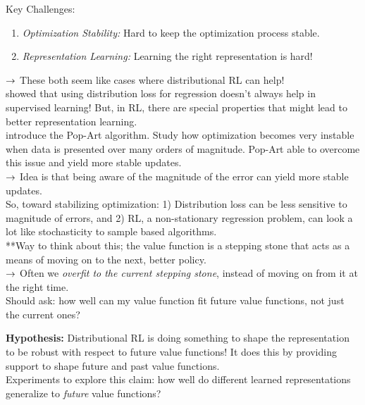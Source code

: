 Key Challenges:
\begin{enumerate}
    \item {\it Optimization Stability:} Hard to keep the optimization process stable.
    \item {\it Representation Learning:} Learning the right representation is hard!
\end{enumerate}

$\rightarrow$ These both seem like cases where distributional RL can help! \\


\citet{imani2018improving} showed that using distribution loss for regression doesn't always help in supervised learning! But, in RL, there are special properties that might lead to better representation learning. \\

\citet{van2016learning} introduce the Pop-Art algorithm. Study how optimization becomes very instable when data is presented over many orders of magnitude. Pop-Art able to overcome this issue and yield more stable updates.\\

$\rightarrow$ Idea is that being aware of the magnitude of the error can yield more stable updates. \\

So, toward stabilizing optimization: 1) Distribution loss can be less sensitive to magnitude of errors, and 2) RL, a non-stationary regression problem, can look a lot like stochasticity to sample based algorithms. \\

**Way to think about this; the value function is a stepping stone that acts as a means of moving on to the next, better policy. \\

$\rightarrow$ Often we {\it overfit to the current stepping stone}, instead of moving on from it at the right time. \\

Should ask: how well can my value function fit future value functions, not just the current ones?


{\bf Hypothesis:} Distributional RL is doing something to shape the representation to be robust with respect to future value functions! It does this by providing support to shape future and past value functions.\\

Experiments to explore this claim: how well do different learned representations generalize to {\it future} value functions? \\

